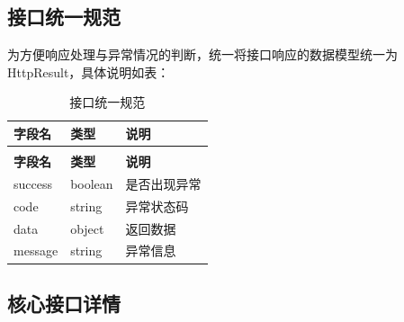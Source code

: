 \subsection{接口统一规范}
为方便响应处理与异常情况的判断，统一将接口响应的数据模型统一为 HttpResult，具体说明如表：
\begin{longtable}{>{\centering\arraybackslash}m{3cm} >{\centering\arraybackslash}m{3cm} >{\centering\arraybackslash}m{4cm}}

    \caption{接口统一规范} \label{tab:training}            \\

    \toprule
    \textbf{字段名 } & \textbf{类型 } & \textbf{说明 }      \\
    \midrule
    \endfirsthead

    \multicolumn{3}{c}{{\tablename\ \thetable{} 续表}} \\
    \toprule
    \textbf{字段名 } & \textbf{类型 } & \textbf{说明 }      \\
    \midrule
    \endhead

    \bottomrule
    \endfoot


    success       & boolean      & 是否出现异常            \\
    code          & string       & 异常状态码             \\
    data          & object       & 返回数据              \\
    message       & string       & 异常信息              \\
\end{longtable}

\subsection{核心接口详情}


